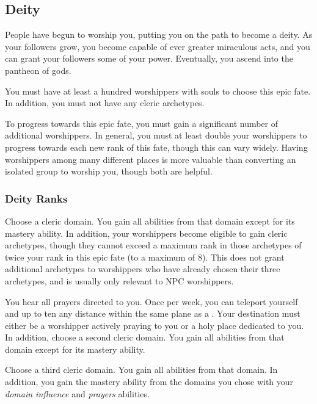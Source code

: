     \subsection{Deity}
        People have begun to worship you, putting you on the path to become a deity.
        As your followers grow, you become capable of ever greater miraculous acts, and you can grant your followers some of your power.
        Eventually, you ascend into the pantheon of gods.

         You must have at least a hundred worshippers with souls to choose this epic fate.
        In addition, you must not have any cleric archetypes.

         To progress towards this epic fate, you must gain a significant number of additional worshippers.
        In general, you must at least double your worshippers to progress towards each new rank of this fate, though this can vary widely.
        Having worshippers among many different places is more valuable than converting an isolated group to worship you, though both are helpful.

        \subsubsection{Deity Ranks}
             Choose a cleric domain.
            You gain all abilities from that domain except for its mastery ability.
            In addition, your worshippers become eligible to gain cleric archetypes, though they cannot exceed a maximum rank in those archetypes of twice your rank in this epic fate (to a maximum of 8).
            This does not grant additional archetypes to worshippers who have already chosen their three archetypes, and is usually only relevant to NPC worshippers.

             You hear all prayers directed to you.
            Once per week, you can teleport yourself and up to ten  any distance within the same plane as a .
            Your destination must either be a worshipper actively praying to you or a holy place dedicated to you.
            In addition, choose a second cleric domain.
            You gain all abilities from that domain except for its mastery ability.

             Choose a third cleric domain.
            You gain all abilities from that domain.
            In addition, you gain the mastery ability from the domains you chose with your \textit{domain influence} and \textit{prayers} abilities.

